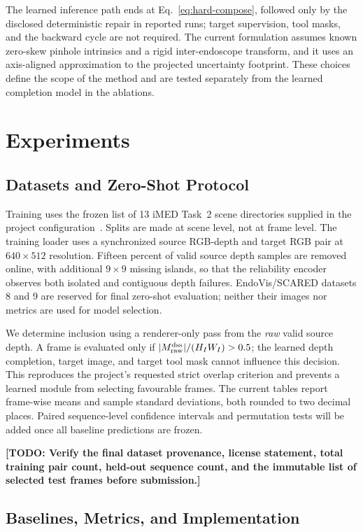 \documentclass[letterpaper,10pt,conference]{ieeeconf}
\newcommand{\todo}[1]{\textcolor{todoRed}{\textbf{[TODO: #1]}}}
\begin{document}
The learned inference path ends at Eq.~\eqref{eq:hard-compose}, followed only by
the disclosed deterministic repair in reported runs; target supervision, tool
masks, and the backward cycle are not required. The current formulation assumes
known zero-skew pinhole intrinsics and a rigid inter-endoscope transform, and it uses an
axis-aligned approximation to the projected uncertainty footprint. These
choices define the scope of the method and are tested separately from the
learned completion model in the ablations.

\section{Experiments}
\label{sec:experiments}

\subsection{Datasets and Zero-Shot Protocol}

Training uses the frozen list of 13 iMED Task~2 scene directories supplied in
the project configuration~\cite{imed2026}. Splits are made at scene level, not
at frame level. The training loader uses a synchronized source RGB-depth and
target RGB pair at $640\times512$ resolution. Fifteen percent of valid source
depth samples are removed online, with additional $9\times9$ missing islands,
so that the reliability encoder observes both isolated and contiguous depth
failures. EndoVis/SCARED datasets 8 and 9 are reserved for final zero-shot
evaluation; neither their images nor metrics are used for model selection.

We determine inclusion using a renderer-only pass from the \emph{raw} valid
source depth. A frame is evaluated only if
$|M_{\rm raw}^{\rm dss}|/(H_IW_I)>0.5$; the learned depth completion, target image,
and target tool mask cannot influence this decision. This reproduces the
project's requested strict overlap criterion and prevents a learned module from
selecting favourable frames. The current tables report frame-wise means and
sample standard deviations, both rounded to two decimal places. Paired
sequence-level confidence intervals and permutation tests will be added once
all baseline predictions are frozen.

\todo{Verify the final dataset provenance, license statement, total training
pair count, held-out sequence count, and the immutable list of selected test
frames before submission.}

\subsection{Baselines, Metrics, and Implementation}
\end{document}
